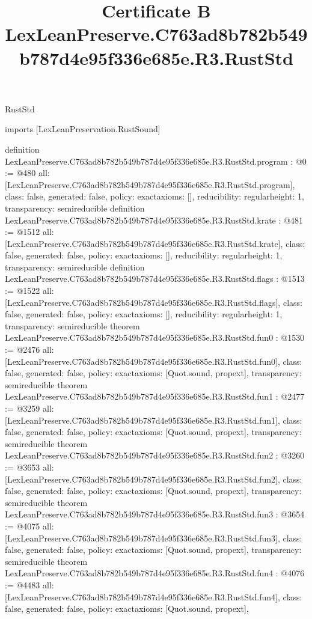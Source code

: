 \begin{lexlean}{RustStd}
\title{Certificate B LexLeanPreserve.C763ad8b782b549b787d4e95f336e685e.R3.RustStd}
\begin{coremodule}
imports [LexLeanPreservation.RustSound]

definition LexLeanPreserve.C763ad8b782b549b787d4e95f336e685e.R3.RustStd.program : @0 := @480 {
  all: [LexLeanPreserve.C763ad8b782b549b787d4e95f336e685e.R3.RustStd.program],
  class: false,
  generated: false,
  policy: exact{axioms: []},
  reducibility: regular{height: 1},
  transparency: semireducible
}
definition LexLeanPreserve.C763ad8b782b549b787d4e95f336e685e.R3.RustStd.krate : @481 := @1512 {
  all: [LexLeanPreserve.C763ad8b782b549b787d4e95f336e685e.R3.RustStd.krate],
  class: false,
  generated: false,
  policy: exact{axioms: []},
  reducibility: regular{height: 1},
  transparency: semireducible
}
definition LexLeanPreserve.C763ad8b782b549b787d4e95f336e685e.R3.RustStd.flags : @1513 := @1522 {
  all: [LexLeanPreserve.C763ad8b782b549b787d4e95f336e685e.R3.RustStd.flags],
  class: false,
  generated: false,
  policy: exact{axioms: []},
  reducibility: regular{height: 1},
  transparency: semireducible
}
theorem LexLeanPreserve.C763ad8b782b549b787d4e95f336e685e.R3.RustStd.fun0 : @1530 := @2476 {
  all: [LexLeanPreserve.C763ad8b782b549b787d4e95f336e685e.R3.RustStd.fun0],
  class: false,
  generated: false,
  policy: exact{axioms: [Quot.sound, propext]},
  transparency: semireducible
}
theorem LexLeanPreserve.C763ad8b782b549b787d4e95f336e685e.R3.RustStd.fun1 : @2477 := @3259 {
  all: [LexLeanPreserve.C763ad8b782b549b787d4e95f336e685e.R3.RustStd.fun1],
  class: false,
  generated: false,
  policy: exact{axioms: [Quot.sound, propext]},
  transparency: semireducible
}
theorem LexLeanPreserve.C763ad8b782b549b787d4e95f336e685e.R3.RustStd.fun2 : @3260 := @3653 {
  all: [LexLeanPreserve.C763ad8b782b549b787d4e95f336e685e.R3.RustStd.fun2],
  class: false,
  generated: false,
  policy: exact{axioms: [Quot.sound, propext]},
  transparency: semireducible
}
theorem LexLeanPreserve.C763ad8b782b549b787d4e95f336e685e.R3.RustStd.fun3 : @3654 := @4075 {
  all: [LexLeanPreserve.C763ad8b782b549b787d4e95f336e685e.R3.RustStd.fun3],
  class: false,
  generated: false,
  policy: exact{axioms: [Quot.sound, propext]},
  transparency: semireducible
}
theorem LexLeanPreserve.C763ad8b782b549b787d4e95f336e685e.R3.RustStd.fun4 : @4076 := @4483 {
  all: [LexLeanPreserve.C763ad8b782b549b787d4e95f336e685e.R3.RustStd.fun4],
  class: false,
  generated: false,
  policy: exact{axioms: [Quot.sound, propext]},
}
\end{coremodule}
\end{lexlean}
